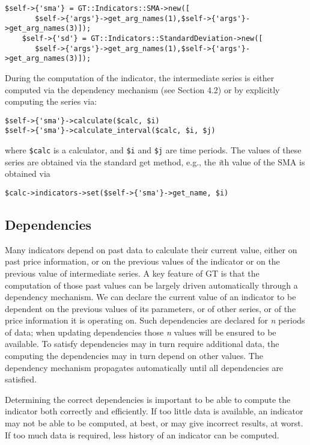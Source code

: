 \documentclass[11pt,twoside]{article}
\begin{document}
\begin{lstlisting}[name=example]
    $self->{'sma'} = GT::Indicators::SMA->new([
       $self->{'args'}->get_arg_names(1),$self->{'args'}->get_arg_names(3)]);
    $self->{'sd'} = GT::Indicators::StandardDeviation->new([
       $self->{'args'}->get_arg_names(1),$self->{'args'}->get_arg_names(3)]);
\end{lstlisting}
During the computation of the indicator, the intermediate series is
either computed via the dependency mechanism (see Section 4.2) or by
explicitly computing the series via:

\begin{lstlisting}[name=example]
$self->{'sma'}->calculate($calc, $i)
$self->{'sma'}->calculate_interval($calc, $i, $j)
\end{lstlisting}
where \lstinline!$calc! is a calculator, and
\lstinline!$i! and \lstinline!$j! are time periods.
The values of these series are obtained via the standard get method,
e.g., the \textit{i}th value of the SMA is obtained via
\begin{lstlisting}[name=example]
$calc->indicators->set($self->{'sma'}->get_name, $i)
\end{lstlisting}

\subsection[Dependencies]{\label{bkm:Ref192502803}Dependencies}
Many indicators depend on past data to calculate their current value,
either on past price information, or on the previous values of the
indicator or on the previous value of intermediate series. A key
feature of GT is that the computation of those past values can be
largely driven automatically through a dependency mechanism. We can
declare the current value of an indicator to be dependent on the
previous values of its parameters, or of other series, or of the price
information it is operating on. Such dependencies are declared for
\textit{n} periods of data; when updating dependencies those \textit{n}
values will be ensured to be available. To satisfy dependencies may in
turn require additional data, the computing the dependencies may in
turn depend on other values. The dependency mechanism propagates
automatically until all dependencies are satisfied. 

Determining the correct dependencies is important to be able to compute
the indicator both correctly and efficiently. If too little data is
available, an indicator may not be able to be computed, at best, or may
give incorrect results, at worst. If too much data is required, less
history of an indicator can be computed.
\end{document}
